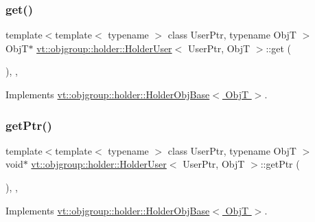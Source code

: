 \subsubsection{\texorpdfstring{get()}{get()}}
{\footnotesize\ttfamily template$<$template$<$ typename $>$ class User\+Ptr, typename ObjT $>$ \\
ObjT$\ast$ \hyperlink{structvt_1_1objgroup_1_1holder_1_1_holder_user}{vt\+::objgroup\+::holder\+::\+Holder\+User}$<$ User\+Ptr, ObjT $>$\+::get (\begin{DoxyParamCaption}{ }\end{DoxyParamCaption})\hspace{0.3cm}{\ttfamily [inline]}, {\ttfamily [override]}, {\ttfamily [virtual]}}



Implements \hyperlink{structvt_1_1objgroup_1_1holder_1_1_holder_obj_base_a4b350b0126259d31a62fd426a08f6698}{vt\+::objgroup\+::holder\+::\+Holder\+Obj\+Base$<$ Obj\+T $>$}.

\mbox{\label{structvt_1_1objgroup_1_1holder_1_1_holder_user_a92734867a29d21a7f165cbb4052717db}} 
\subsubsection{\texorpdfstring{get\+Ptr()}{getPtr()}}
{\footnotesize\ttfamily template$<$template$<$ typename $>$ class User\+Ptr, typename ObjT $>$ \\
void$\ast$ \hyperlink{structvt_1_1objgroup_1_1holder_1_1_holder_user}{vt\+::objgroup\+::holder\+::\+Holder\+User}$<$ User\+Ptr, ObjT $>$\+::get\+Ptr (\begin{DoxyParamCaption}{ }\end{DoxyParamCaption})\hspace{0.3cm}{\ttfamily [inline]}, {\ttfamily [override]}, {\ttfamily [virtual]}}



Implements \hyperlink{structvt_1_1objgroup_1_1holder_1_1_holder_obj_base_aa08fdb3d076043c004e3674a136f84c3}{vt\+::objgroup\+::holder\+::\+Holder\+Obj\+Base$<$ Obj\+T $>$}.

\mbox{\label{structvt_1_1objgroup_1_1holder_1_1_holder_user_a4a43e5b38a0474cd523ccd9aa66950e9}} 
